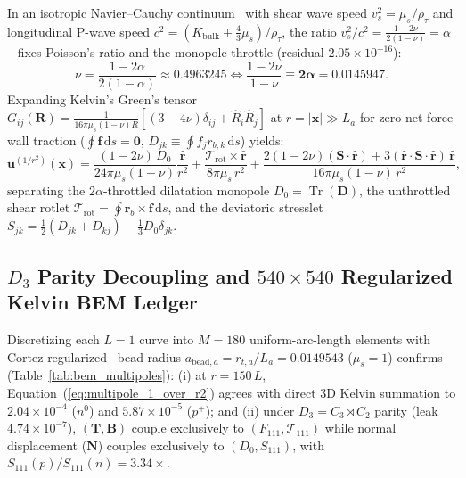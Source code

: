 \documentclass[11pt, a4paper]{article}
\DeclareRobustCommand{\dd}{\mathrm{d}}
\begin{document}
In an isotropic Navier--Cauchy continuum~\cite{cauchy1828,stokes1845} with shear wave speed $v_s^2 = \mu_s/\rho_\tau$ and longitudinal P-wave speed $c^2 = (K_{\mathrm{bulk}} + \frac{4}{3}\mu_s)/\rho_\tau$, the ratio $v_s^2/c^2 = \frac{1-2\nu}{2(1-\nu)} = \alpha$~\cite{bairmosheh2026,bairmosheh2026b} fixes Poisson's ratio and the monopole throttle (residual $2.05 \times 10^{-16}$):
\begin{equation}
    \nu = \frac{1 - 2\alpha}{2(1 - \alpha)} \approx 0.4963245 \iff \frac{1 - 2\nu}{1 - \nu} \equiv \mathbf{2\alpha} = 0.0145947.
    \label{eq:poisson_alpha}
\end{equation}
Expanding Kelvin's Green's tensor~\cite{kelvin1848} $G_{ij}(\mathbf{R}) = \frac{1}{16\pi\mu_s(1-\nu)R}[(3-4\nu)\delta_{ij} + \hat{R}_i\hat{R}_j]$ at $r = |\mathbf{x}| \gg L_a$ for zero-net-force wall traction ($\oint\mathbf{f}\,\dd s = \mathbf{0}$, $D_{jk} \equiv \oint f_j r_{b,k}\,\dd s$) yields:
\begin{equation}
    \mathbf{u}^{(1/r^2)}(\mathbf{x}) = \frac{(1 - 2\nu)\,D_0}{24\pi\mu_s(1-\nu)}\frac{\hat{\mathbf{r}}}{r^2} + \frac{\boldsymbol{\mathcal{T}}_{\mathrm{rot}} \times \hat{\mathbf{r}}}{8\pi\mu_s\,r^2} + \frac{2(1 - 2\nu)(\mathbf{S}\cdot\hat{\mathbf{r}}) + 3(\hat{\mathbf{r}}\cdot\mathbf{S}\cdot\hat{\mathbf{r}})\,\hat{\mathbf{r}}}{16\pi\mu_s(1-\nu)\,r^2},
    \label{eq:multipole_1_over_r2}
\end{equation}
separating the $2\alpha$-throttled dilatation monopole $D_0 = \operatorname{Tr}(\mathbf{D})$, the unthrottled shear rotlet $\boldsymbol{\mathcal{T}}_{\mathrm{rot}} = \oint\mathbf{r}_b\times\mathbf{f}\,\dd s$, and the deviatoric stresslet $S_{jk} = \frac{1}{2}(D_{jk} + D_{kj}) - \frac{1}{3}D_0\delta_{jk}$.

\subsection{\texorpdfstring{$D_3$ Parity Decoupling and $540 \times 540$ Regularized Kelvin BEM Ledger}{D3 Parity Decoupling and 540x540 Regularized Kelvin BEM Ledger}}
Discretizing each $L = 1$ curve into $M = 180$ uniform-arc-length elements with Cortez-regularized~\cite{happel1965} bead radius $a_{\mathrm{bead},a} = r_{t,a}/L_a = 0.0149543$ ($\mu_s = 1$) confirms (Table~\ref{tab:bem_multipoles}): (i) at $r = 150\,L$, Equation~(\ref{eq:multipole_1_over_r2}) agrees with direct 3D Kelvin summation to $2.04 \times 10^{-4}$ ($n^0$) and $5.87 \times 10^{-5}$ ($p^+$); and (ii) under $D_3 = C_3 \rtimes C_2$ parity (leak $4.74 \times 10^{-7}$), $(\mathbf{T}, \mathbf{B})$ couple exclusively to $(F_{111}, \mathcal{T}_{111})$ while normal displacement ($\mathbf{N}$) couples exclusively to $(D_0, S_{111})$, with $S_{111}(p)/S_{111}(n) = \mathbf{3.34\times}$.
\end{document}
